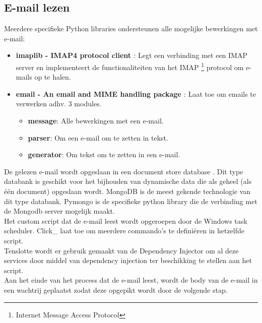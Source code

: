 \subsection{E-mail lezen}
Meerdere specifieke Python libraries ondersteunen alle mogelijke bewerkingen met e-mail:
\begin{itemize}
    \item \textbf{imaplib - IMAP4 protocol client \autocite{Imaplib2025}}: Legt een verbinding met een IMAP server en implementeert de functionaliteiten van het IMAP \footnote{Internet Message Access Protocol} protocol om e-mails op te halen.\autocite{Imap2025}
    \item \textbf{email - An email and MIME handling package \autocite{Email2025}}: Laat toe om emails te verwerken adhv. 3 modules.
    \begin{itemize}
        \item \textbf{message}: Alle bewerkingen met een e-mail.
        \item \textbf{parser}: Om een e-mail om te zetten in tekst.
        \item \textbf{generator}: Om tekst om te zetten in een e-mail. 
    \end{itemize}
\end{itemize}
De gelezen e-mail wordt opgeslaan in een document store database \autocite{Documentstore2025}. Dit type databank is geschikt voor het bijhouden van dynamische data die als geheel (als één document) opgeslaan wordt. MongoDB \autocite{Mongodb2025} is de meest gekende technologie van dit type databank. Pymongo \autocite{Pymongo2025} is de specifieke python library die de verbinding met de Mongodb server mogelijk maakt.\\
Het custom script dat de e-mail leest wordt opgeroepen door de Windows task scheduler. Click\_ \autocite{Click2025} laat toe om meerdere commando's te definiëren in hetzelfde script.\\
Tenslotte wordt er gebruik gemaakt van de Dependency Injector \autocite{Dependencyinjector2025} om al deze services door middel van dependency injection \autocite{Di2025} ter beschikking te stellen aan het script.\\
Aan het einde van het process dat de e-mail leest, wordt de body van de e-mail in een wachtrij geplaatst zodat deze opgepikt wordt door de volgende stap.
